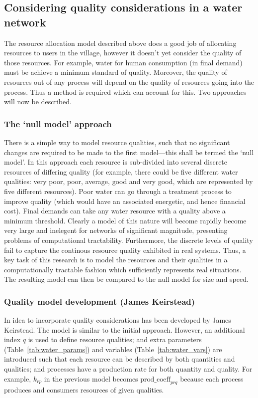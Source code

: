 \subsection{Considering quality considerations in a water network}
The resource allocation model described above does a good job of allocating resources to users in the village, however it doesn't yet consider the quality of those resources. For example, water for human consumption (in final demand) must be achieve a minimum standard of quality. Moreover, the quality of resources out of any process will depend on the quality of resources going into the process. Thus a method is required which can account for this. Two approaches will now be described.

\subsubsection*{The `null model' approach}
There is a simple way to model resource qualities, such that no significant changes are required to be made to the first model---this shall be termed the `null model'. In this approach each resource is sub-divided into several discrete resources of differing quality (for example, there could be five different water qualities: very poor, poor, average, good and very good, which are represented by five different resources). Poor water can go through a treatment process to improve quality (which would have an associated energetic, and hence financial cost). Final demands can take any water resource with a quality above a minimum threshold. Clearly a model of this nature will become rapidly become very large and inelegent for networks of significant magnitude, presenting problems of computational tractability. Furthermore, the discrete levels of quality fail to capture the continous resource quality exhibited in real systems.  Thus, a key task of this research is to model the resources and their qualities in a computationally tractable fashion which sufficiently represents real situations. The resulting model can then be compared to the null model for size and speed.

\subsubsection*{Quality model development (James Keirstead)}
In idea to incorporate quality considerations has been developed by James Keirstead. The model is similar to the initial approach. However, an additional index $q$ is used to define resource qualities; and extra parameters (Table~\ref{tab:water_params}) and variables (Table~\ref{tab:water_vars}) are introduced such that each resource can be described by both quantities and qualities; and processes have a production rate for both quantity and quality. For example, $k_{rp}$ in the previous model becomes $\mbox{prod\_coeff}_{prq}$ because each process produces and consumers resources of given qualities.
 
 

